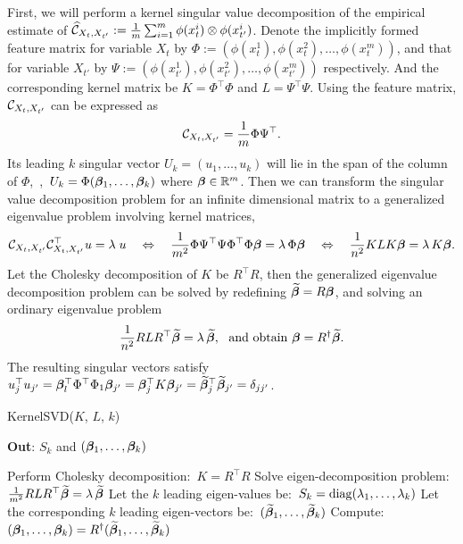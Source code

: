 \documentclass[11pt]{article}
\begin{document}
First, we will perform a kernel singular value decomposition of the empirical estimate of $\widehat {\mathcal{C}}_{X_t,X_{t'}}:= \frac{1}{m} \sum_{i=1}^m \phi(x_t^i) \otimes \phi(x_{t'}^i)$. Denote the implicitly formed feature matrix for variable $X_t$ by $\Phi := (\phi(x_t^1),  \phi(x_t^2), \ldots, \phi(x_t^m))$, and that for variable $X_{t'}$ by $\Psi := (\phi(x_{t'}^1), \phi(x_{t'}^2), \ldots, \phi(x_{t'}^m))$ respectively. And the corresponding kernel matrix be $K = \Phi^\top \Phi$ and $L = \Psi^\top \Psi$. Using the feature matrix, $\mathcal{C}_{X_t,X_{t'}}$ can be expressed as
$$
	\mathcal{C}_{X_t,X_{t'}} = \frac{1}{m} \Phi \Psi^\top.
$$
Its leading $k$ singular vector $U_k = (u_1,\ldots,u_k)$ will lie in the span of the column of  $\Phi$,~\ie,~$U_k = \Phi (\boldsymbol{\beta}_1,\ldots,\boldsymbol{\beta}_k)$ where $\boldsymbol{\beta} \in \mathbb{R}^m$. Then we can transform the singular value decomposition problem for an infinite dimensional matrix to a generalized eigenvalue problem involving kernel matrices,
$$
	\mathcal{C}_{X_t,X_{t'}} \mathcal{C}_{X_t,X_{t'}}^\top u = \lambda\;u
	\quad \Leftrightarrow \quad
	\frac{1}{m^2}\Phi \Psi^\top \Psi \Phi^\top \Phi \boldsymbol{\beta} = \lambda\,\Phi \boldsymbol{\beta}
	\quad \Leftrightarrow \quad
	\frac{1}{n^2} K L K \boldsymbol{\beta} = \lambda\,K \boldsymbol{\beta}.
$$
Let the Cholesky decomposition of $K$ be $R^\top R$, then the generalized eigenvalue decomposition problem can be solved by redefining $\widetilde{\boldsymbol{\beta}}=R\boldsymbol{\beta}$, and solving an ordinary eigenvalue problem
\begin{align}
 \frac{1}{n^2} R L R^\top \widetilde{\boldsymbol{\beta}} = \lambda\, \widetilde{\boldsymbol{\beta}},~~\text{and obtain}~\boldsymbol{\beta} = R^{\dagger} \widetilde{\boldsymbol{\beta}}.
\end{align}
The resulting singular vectors satisfy $u_j^\top u_{j'} = \boldsymbol{\beta}_l^\top \Phi^\top \Phi_1 \boldsymbol{\beta}_{j'} =  \boldsymbol{\beta}_{j}^\top K  \boldsymbol{\beta}_{j'} =  \widetilde{\boldsymbol{\beta}}_{j}^\top \widetilde{\boldsymbol{\beta}}_{j'}=\delta_{jj'}$.

\begin{algorithm}[t!]
\caption{KernelSVD($K$, $L$, $k$)}
	\textbf{Out}: $S_k$ and $(\boldsymbol{\beta}_1,\ldots,\boldsymbol{\beta}_k)$\\[-0.4cm]
  \begin{algorithmic}[1]
    \STATE Perform Cholesky decomposition:\ $K=R^\top R$
    \STATE Solve eigen-decomposition problem:\ $\frac{1}{m^2} R L R^\top \widetilde{\boldsymbol{\beta}} = \lambda\,\widetilde{\boldsymbol{\beta}}$
		\STATE Let the $k$ leading eigen-values be:\ $S_k = \mathop{\mathrm{diag}}(\lambda_1,\ldots,\lambda_k)$
		\STATE Let the corresponding $k$ leading eigen-vectors be:\ $(\widetilde{\boldsymbol{\beta}}_1,\ldots,\widetilde{\boldsymbol{\beta}}_k)$
    \STATE Compute:\ $(\boldsymbol{\beta}_1,\ldots,\boldsymbol{\beta}_k) = R^\dagger (\widetilde{\boldsymbol{\beta}}_1,\ldots,\widetilde{\boldsymbol{\beta}}_k)$
  \end{algorithmic}
  \label{alg:svd}
\end{algorithm}
\end{document}
